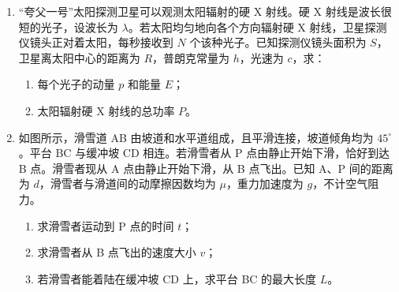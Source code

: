 \documentclass[\gkver]{gaokaozhenti}
\begin{document}
\begin{enumerate}

\item
“夸父一号”太阳探测卫星可以观测太阳辐射的硬 X 射线。硬 X 射线是波长很短的光子，设波长为 $\lambda$。若太阳均匀地向各个方向辐射硬 X 射线，卫星探测仪镜头正对着太阳，每秒接收到 $N$ 个该种光子。已知探测仪镜头面积为 $S$，卫星离太阳中心的距离为 $R$，普朗克常量为 $h$，光速为 $c$，求：
\begin{enumerate}
	\item
	每个光子的动量 $p$ 和能量 $E$；
	\item
	太阳辐射硬 X 射线的总功率 $P$。
\end{enumerate}

\item
如图所示，滑雪道 AB 由坡道和水平道组成，且平滑连接，坡道倾角均为 $45^{\circ}$。平台 BC 与缓冲坡 CD 相连。若滑雪者从 P 点由静止开始下滑，恰好到达 B 点。滑雪者现从 A 点由静止开始下滑，从 B 点飞出。已知 A、P 间的距离为 $d$，滑雪者与滑道间的动摩擦因数均为 $\mu$，重力加速度为 $g$，不计空气阻力。
\begin{enumerate}
	\item
	求滑雪者运动到 P 点的时间 $t$；
	\item
	求滑雪者从 B 点飞出的速度大小 $v$；
	\item
	若滑雪者能着陆在缓冲坡 CD 上，求平台 BC 的最大长度 $L$。
\end{enumerate}


\end{enumerate}
\end{document}
